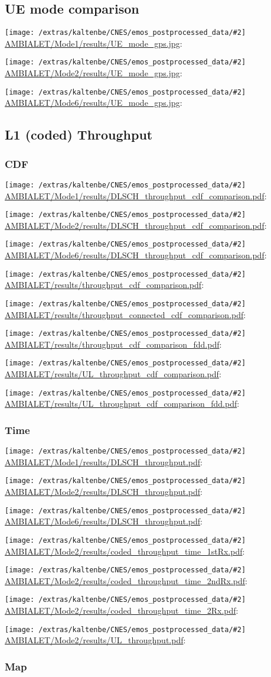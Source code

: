\documentclass[a4paper,10pt]{article}
\newcommand{\printfile}[2][]{
 \begin{minipage}{8cm}
  \centering
  \texttt{[image: /extras/kaltenbe/CNES/emos\_postprocessed\_data/\#2]}
  \url{#2}: #1

 \end{minipage}
}
\begin{document}
\subsection{UE mode comparison}

\printfile{AMBIALET/Mode1/results/UE_mode_gps.jpg}
\printfile{AMBIALET/Mode2/results/UE_mode_gps.jpg}

\printfile{AMBIALET/Mode6/results/UE_mode_gps.jpg}

\subsection{L1 (coded) Throughput}


\subsubsection{CDF}

\printfile{AMBIALET/Mode1/results/DLSCH_throughput_cdf_comparison.pdf}
\printfile{AMBIALET/Mode2/results/DLSCH_throughput_cdf_comparison.pdf}

\printfile{AMBIALET/Mode6/results/DLSCH_throughput_cdf_comparison.pdf}

\printfile{AMBIALET/results/throughput_cdf_comparison.pdf}
\printfile{AMBIALET/results/throughput_connected_cdf_comparison.pdf}

\printfile{AMBIALET/results/throughput_cdf_comparison_fdd.pdf}

\printfile{AMBIALET/results/UL_throughput_cdf_comparison.pdf}
\printfile{AMBIALET/results/UL_throughput_cdf_comparison_fdd.pdf}

\subsubsection{Time}

\printfile{AMBIALET/Mode1/results/DLSCH_throughput.pdf}
\printfile{AMBIALET/Mode2/results/DLSCH_throughput.pdf}

\printfile{AMBIALET/Mode6/results/DLSCH_throughput.pdf}
\printfile{AMBIALET/Mode2/results/coded_throughput_time_1stRx.pdf}

\printfile{AMBIALET/Mode2/results/coded_throughput_time_2ndRx.pdf}
\printfile{AMBIALET/Mode2/results/coded_throughput_time_2Rx.pdf}

\printfile{AMBIALET/Mode2/results/UL_throughput.pdf}


\subsubsection{Map}
\end{document}
